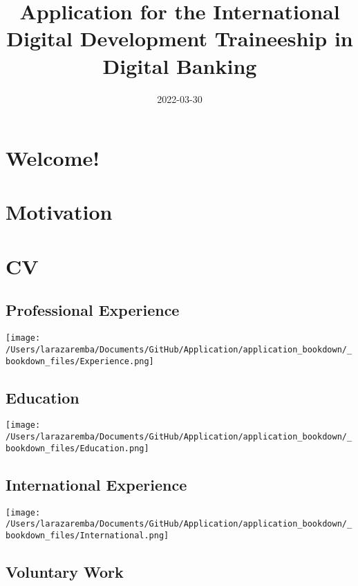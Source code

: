 \documentclass[
]{book}
\title{Application for the International Digital Development Traineeship in Digital Banking}
\author{}
\date{\vspace{-2.5em}2022-03-30}
\begin{document}
\maketitle

{
\setcounter{tocdepth}{1}
\tableofcontents
}
\hypertarget{welcome}{%
\chapter{Welcome!}\label{welcome}}

\hypertarget{motivation}{%
\chapter{Motivation}\label{motivation}}

\hypertarget{cv}{%
\chapter{CV}\label{cv}}

\hypertarget{professional-experience}{%
\section{Professional Experience}\label{professional-experience}}

\texttt{[image: /Users/larazaremba/Documents/GitHub/Application/application\_bookdown/\_bookdown\_files/Experience.png]}

\hypertarget{education}{%
\section{Education}\label{education}}

\texttt{[image: /Users/larazaremba/Documents/GitHub/Application/application\_bookdown/\_bookdown\_files/Education.png]}

\hypertarget{international-experience}{%
\section{International Experience}\label{international-experience}}

\texttt{[image: /Users/larazaremba/Documents/GitHub/Application/application\_bookdown/\_bookdown\_files/International.png]}

\hypertarget{voluntary-work}{%
\section{Voluntary Work}\label{voluntary-work}}
\end{document}
